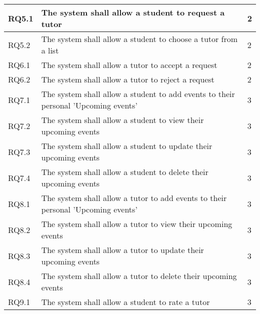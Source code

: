 \documentclass[12pt]{article}
\begin{document}
{\begin{longtable}{| l | p{10cm}| l |}
				RQ5.1 & The system shall allow a student to request a tutor & 2\\ \hline
				RQ5.2 & The system shall allow a student to choose a tutor from a list  & 2\\ \hline

				RQ6.1 & The system shall allow a tutor to accept a request & 2\\ \hline
				RQ6.2 & The system shall allow a tutor to reject a request & 2\\ \hline
		

				RQ7.1 & The system shall allow a student to add events to their personal 'Upcoming events' & 3\\ \hline	
				RQ7.2 & The system shall allow a student to view their upcoming events & 3\\ \hline
				RQ7.3 & The system shall allow a student to update their upcoming events & 3\\ \hline
				RQ7.4 & The system shall allow a student to delete their upcoming events & 3\\ \hline
				
				RQ8.1 & The system shall allow a tutor to add events to their personal 'Upcoming events'  & 3\\ \hline	
				RQ8.2 & The system shall allow a tutor to view their upcoming events  & 3\\ \hline
				RQ8.3 & The system shall allow a tutor to update their upcoming events & 3\\ \hline
				RQ8.4 & The system shall allow a tutor to delete their upcoming events& 3\\ \hline
								
				RQ9.1 & The system shall allow a student to rate a tutor & 3\\ \hline


\end{longtable}}
\end{document}
